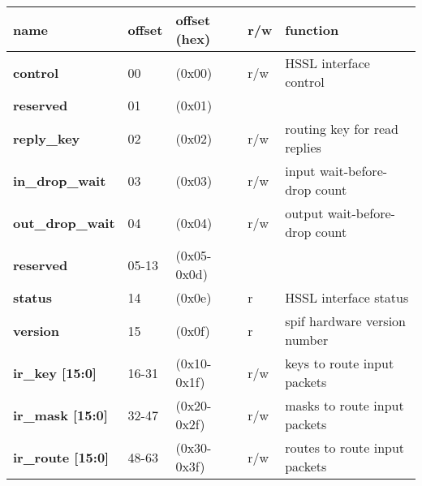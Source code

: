 \documentclass[11pt,a4paper,twoside]{article}
\begin{document}
\begin{center}
\begin{table}[!h]
	\begin{tabularx}{\textwidth}{| p{36mm} p{13mm} p{21mm} p{7mm} X |}
		\hline
		\textbf{name}                        & \textbf{offset}            & \textbf{offset} (hex)          & \textbf{r/w}        & \textbf{function} \\%
		\hline
		\hline
		\textbf{control}                     & 00                         & (0x00)                         & r/w                 & HSSL interface control \\%
		\cellcolor{gray!25}\textbf{reserved} & \cellcolor{gray!25}01      & \cellcolor{gray!25}(0x01) & \cellcolor{gray!25} & \cellcolor{gray!25}\\%
		\textbf{reply\_key}                  & 02                         & (0x02)                         & r/w                 & routing key for read replies \\%
		\textbf{in\_drop\_wait}              & 03                         & (0x03)                         & r/w                 & input wait-before-drop count \\%
		\textbf{out\_drop\_wait}             & 04                         & (0x04)                         & r/w                 & output wait-before-drop count \\%
		\cellcolor{gray!25}\textbf{reserved} & \cellcolor{gray!25}05-13   & \cellcolor{gray!25}(0x05-0x0d) & \cellcolor{gray!25} & \cellcolor{gray!25}\\%
		\textbf{status}                      & 14                         & (0x0e)                         & r                   & HSSL interface status \\%
		\textbf{version}                     & 15                         & (0x0f)                         & r                   & spif hardware version number \\%
		\textbf{ir\_key [15:0]}              & 16-31                      & (0x10-0x1f)                    & r/w                 & keys to route input packets \\%
		\textbf{ir\_mask [15:0]}             & 32-47                      & (0x20-0x2f)                    & r/w                 & masks to route input packets \\%
		\textbf{ir\_route [15:0]}            & 48-63                      & (0x30-0x3f)                    & r/w                 & routes to route input packets \\%

\end{tabularx}
\end{table}
\end{center}
\end{document}
